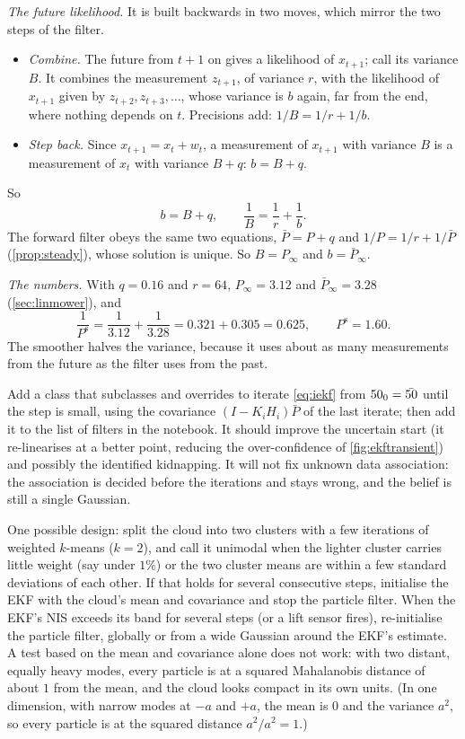 \emph{The future likelihood.} It is built backwards in two moves, which
mirror the two steps of the filter.
\begin{itemize}[nosep]
  \item \emph{Combine.} The future from $t+1$ on gives a likelihood of
        $x_{t+1}$; call its variance $B$. It combines the measurement
        $z_{t+1}$, of variance $r$, with the likelihood of $x_{t+1}$ given
        by $z_{t+2},z_{t+3},\dots$, whose variance is $b$ again, far from
        the end, where nothing depends on $t$. Precisions add:
        $1/B=1/r+1/b$.
  \item \emph{Step back.} Since $x_{t+1}=x_t+w_t$, a measurement of
        $x_{t+1}$ with variance $B$ is a measurement of $x_t$ with variance
        $B+q$: $b=B+q$.
\end{itemize}
So
\[
  b=B+q,\qquad\frac1B=\frac1r+\frac1b .
\]
The forward filter obeys the same two equations, $\bar P=P+q$ and
$1/P=1/r+1/\bar P$ (\cref{prop:steady}), whose solution is unique. So
$B=P_\infty$ and $b=\bar P_\infty$.

\emph{The numbers.} With $q=0.16$ and $r=64$, $P_\infty=3.12$ and
$\bar P_\infty=3.28$ (\cref{sec:linmower}), and
\[
  \frac1{P^{\mathrm s}}=\frac1{3.12}+\frac1{3.28}=0.321+0.305=0.625,
  \qquad P^{\mathrm s}=1.60 .
\]
The smoother halves the variance, because it uses about as many
measurements from the future as the filter uses from the past.

 Add a class  that subclasses  and
overrides  to iterate \eqref{eq:iekf} from $50_0=\bar{50}$ until
the step is small, using the covariance $(I-K_iH_i)\bar P$ of the last
iterate; then add it to the list of filters in the notebook. It should
improve the uncertain start (it re-linearises at a better point, reducing
the over-confidence of \cref{fig:ekftransient}) and possibly the
identified kidnapping. It will not fix unknown data association: the
association is decided before the iterations and stays wrong, and the
belief is still a single Gaussian.

 One possible design: split the cloud into two clusters
with a few iterations of weighted $k$-means ($k=2$), and call it unimodal
when the lighter cluster carries little weight (say under $1\%$) or the
two cluster means are within a few standard deviations of each other. If
that holds for several consecutive steps, initialise the EKF with the
cloud's mean and covariance and stop the particle filter. When the EKF's NIS exceeds its band for
several steps (or a lift sensor fires), re-initialise the particle filter,
globally or from a wide Gaussian around the EKF's estimate. A test
based on the mean and covariance alone does not work: with two distant,
equally heavy modes, every particle is at a squared Mahalanobis distance
of about $1$ from the mean, and the cloud looks compact in its own
units. (In one dimension, with narrow modes at $-a$ and $+a$, the mean is
$0$ and the variance $a^2$, so every particle is at the squared distance
$a^2/a^2=1$.)

